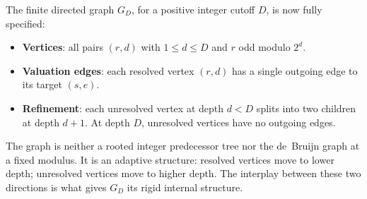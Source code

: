 \documentclass[11pt]{amsart}
\theoremstyle{definition}
\theoremstyle{remark}
\begin{document}
The finite directed graph $G_D$, for a positive integer cutoff $D$, is now fully specified:
\begin{itemize}
\item \textbf{Vertices}: all pairs $(r,d)$ with $1\le d\le D$ and $r$ odd modulo $2^d$.
\item \textbf{Valuation edges}: each resolved vertex $(r,d)$ has a single outgoing edge to its target $(s,e)$.
\item \textbf{Refinement}: each unresolved vertex at depth $d<D$ splits into two children at depth $d+1$.  At depth $D$, unresolved vertices have no outgoing edges.
\end{itemize}

The graph is neither a rooted integer predecessor tree nor the de~Bruijn graph at a fixed modulus.  It is an adaptive structure: resolved vertices move to lower depth; unresolved vertices move to higher depth.  The interplay between these two directions is what gives $G_D$ its rigid internal structure.
\end{document}
